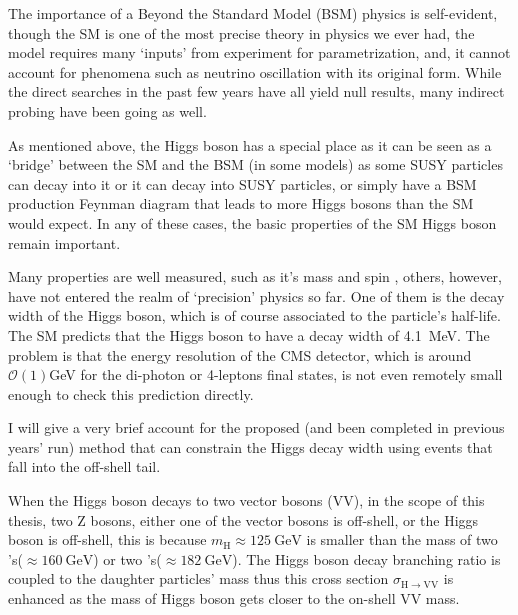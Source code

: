The importance of a Beyond the Standard Model (BSM) physics is self-evident, though the SM is one
of the most precise theory in physics we ever had, the model requires many `inputs' from experiment
for parametrization, and, it cannot account for phenomena such as neutrino oscillation with its
original form. While the direct searches in the past few years have all yield null results,
many indirect probing have been going as well.

As mentioned above, the Higgs boson has a special place as it can be seen as a `bridge' between
the SM and the BSM (in some models) as some SUSY particles can decay into it or it can decay
into SUSY particles, or simply have a BSM production Feynman diagram that leads to more Higgs
bosons than the SM would expect. In any of these cases, the basic properties of the SM Higgs
boson remain important.

Many properties are well measured, such as it's mass and spin \cite{higgs_papers}, others, however,
have not entered the realm of `precision' physics so far. One of them is the decay width of
the Higgs boson, which is of course associated to the particle's half-life. The SM predicts
that the Higgs boson to have a decay width of \SI{4.1}{\mega\electronvolt}. The problem is
that the energy resolution of the CMS detector, which is around $\mathcal{O}(1)$\si{\giga\electronvolt}
for the di-photon or 4-leptons final states, is not even remotely small enough to check this 
prediction directly.

I will give a very brief account\cite{ulascan} for the proposed (and been completed in previous years' run)
method that can constrain the Higgs decay width using events that fall into the off-shell
tail.

When the Higgs boson decays to two vector bosons (VV), in the scope of this thesis, two Z bosons,
either one of the vector bosons is off-shell, or the Higgs boson is off-shell, this is because
$m_\text{H}\approx\SI{125}{\giga\electronvolt}$ is smaller than the 
mass of two \PW{}'s($\approx\SI{160}{\giga\electronvolt}$) 
or two \PZ{}'s($\approx\SI{182}{\giga\electronvolt}$). The Higgs boson decay branching ratio
is coupled to the daughter particles' mass thus this cross section
$\sigma_{\mathrm{H}\rightarrow\mathrm{VV}}$ is enhanced as the mass of Higgs boson gets closer to 
the on-shell VV mass.  

